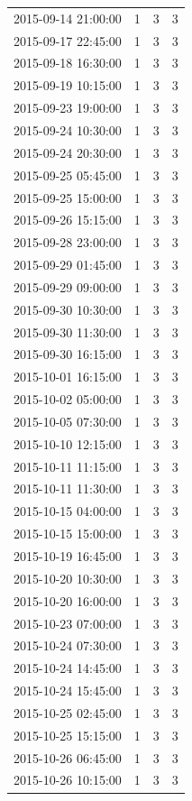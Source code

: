\begin{tabular}{lrrr}
2015-09-14 21:00:00 & 1 & 3 & 3 \\
2015-09-17 22:45:00 & 1 & 3 & 3 \\
2015-09-18 16:30:00 & 1 & 3 & 3 \\
2015-09-19 10:15:00 & 1 & 3 & 3 \\
2015-09-23 19:00:00 & 1 & 3 & 3 \\
2015-09-24 10:30:00 & 1 & 3 & 3 \\
2015-09-24 20:30:00 & 1 & 3 & 3 \\
2015-09-25 05:45:00 & 1 & 3 & 3 \\
2015-09-25 15:00:00 & 1 & 3 & 3 \\
2015-09-26 15:15:00 & 1 & 3 & 3 \\
2015-09-28 23:00:00 & 1 & 3 & 3 \\
2015-09-29 01:45:00 & 1 & 3 & 3 \\
2015-09-29 09:00:00 & 1 & 3 & 3 \\
2015-09-30 10:30:00 & 1 & 3 & 3 \\
2015-09-30 11:30:00 & 1 & 3 & 3 \\
2015-09-30 16:15:00 & 1 & 3 & 3 \\
2015-10-01 16:15:00 & 1 & 3 & 3 \\
2015-10-02 05:00:00 & 1 & 3 & 3 \\
2015-10-05 07:30:00 & 1 & 3 & 3 \\
2015-10-10 12:15:00 & 1 & 3 & 3 \\
2015-10-11 11:15:00 & 1 & 3 & 3 \\
2015-10-11 11:30:00 & 1 & 3 & 3 \\
2015-10-15 04:00:00 & 1 & 3 & 3 \\
2015-10-15 15:00:00 & 1 & 3 & 3 \\
2015-10-19 16:45:00 & 1 & 3 & 3 \\
2015-10-20 10:30:00 & 1 & 3 & 3 \\
2015-10-20 16:00:00 & 1 & 3 & 3 \\
2015-10-23 07:00:00 & 1 & 3 & 3 \\
2015-10-24 07:30:00 & 1 & 3 & 3 \\
2015-10-24 14:45:00 & 1 & 3 & 3 \\
2015-10-24 15:45:00 & 1 & 3 & 3 \\
2015-10-25 02:45:00 & 1 & 3 & 3 \\
2015-10-25 15:15:00 & 1 & 3 & 3 \\
2015-10-26 06:45:00 & 1 & 3 & 3 \\
2015-10-26 10:15:00 & 1 & 3 & 3 \\

\end{tabular}
